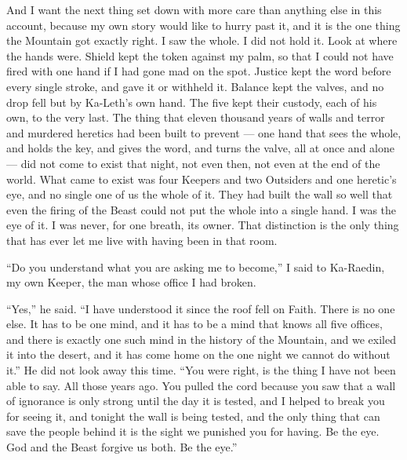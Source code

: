 And I want the next thing set down with more care than anything else in this account, because my own story would like to hurry past it, and it is the one thing the Mountain got exactly right. I saw the whole. I did not hold it. Look at where the hands were. Shield kept the token against my palm, so that I could not have fired with one hand if I had gone mad on the spot. Justice kept the word before every single stroke, and gave it or withheld it. Balance kept the valves, and no drop fell but by Ka-Leth's own hand. The five kept their custody, each of his own, to the very last. The thing that eleven thousand years of walls and terror and murdered heretics had been built to prevent --- one hand that sees the whole, and holds the key, and gives the word, and turns the valve, all at once and alone --- did not come to exist that night, not even then, not even at the end of the world. What came to exist was four Keepers and two Outsiders and one heretic's eye, and no single one of us the whole of it. They had built the wall so well that even the firing of the Beast could not put the whole into a single hand. I was the eye of it. I was never, for one breath, its owner. That distinction is the only thing that has ever let me live with having been in that room.\par

``Do you understand what you are asking me to become,'' I said to Ka-Raedin, my own Keeper, the man whose office I had broken.\par

``Yes,'' he said. ``I have understood it since the roof fell on Faith. There is no one else. It has to be one mind, and it has to be a mind that knows all five offices, and there is exactly one such mind in the history of the Mountain, and we exiled it into the desert, and it has come home on the one night we cannot do without it.'' He did not look away this time. ``You were right, is the thing I have not been able to say. All those years ago. You pulled the cord because you saw that a wall of ignorance is only strong until the day it is tested, and I helped to break you for seeing it, and tonight the wall is being tested, and the only thing that can save the people behind it is the sight we punished you for having. Be the eye. God and the Beast forgive us both. Be the eye.''\par

